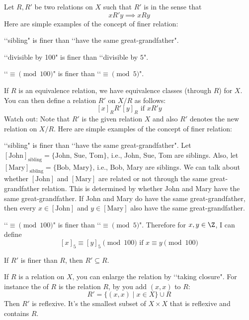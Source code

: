 Let $R, R'$ be two relations on $X$ such that
$R'$ is  in the sense that
\[
x R' y \implies x R y
\]
Here are simple examples of the concept of finer relation:
\begin{myenum}
\item
  \lq\lq sibling" is finer than \lq\lq have the same great-grandfather".
\item
  \lq\lq divisible by 100" is finer than \lq\lq divisible by $5$".
\item
  \lq\lq $\equiv \pmod{100}$" is finer than \lq\lq $\equiv \pmod{5}$".  
\end{myenum}
If $R$ is an equivalence relation, we have equivalence classes (through $R$)
for $X$.
You can then define a relation $R'$ on $X/R$ as follows:
\[
[x]_R R' [y]_R \text{ if } x R' y
\]
Watch out: Note that $R'$ is the given relation $X$
and also $R'$ denotes the new relation on $X/R$.
Here are simple examples of the concept of finer relation:
\begin{myenum}
\item
  \lq\lq sibling" is finer than \lq\lq have the same great-grandfather".
  Let $[\text{John}]_{\text{sibling}} = \{\text{John, Sue, Tom}\}$,
    i.e., John, Sue, Tom are siblings.
  Also, let $[\text{Mary}]_{\text{sibling}} = \{\text{Bob, Mary}\}$,
    i.e., Bob, Mary are siblings.
    We can talk about whether
    $[\text{John}]$ and $[\text{Mary}]$ are related or not
    through the same great-grandfather relation.
    This is determined by whether John and Mary have the same
    great-grandfather.
    If John and Mary do have the same great-grandfather,
    then every $x \in [\text{John}]$ and $y \in [\text{Mary}]$
    also have the same great-grandfather.
\item
  \lq\lq $\equiv \pmod{100}$" is finer than \lq\lq $\equiv \pmod{5}$".
  Therefore for $x, y \in \Z$, I can define
  \[
  [x]_{5} \equiv [y]_5 \pmod{100} \text{ if } x \equiv y \pmod{100}
  \]
\end{myenum}

\begin{prop}
  If $R'$ is finer than $R$, then $R' \subseteq R$.
\end{prop}

If $R$ is a relation on $X$, you can enlarge the relation by \lq\lq taking
closure".
For instance the  of $R$ is the relation $R$, by
you add $(x, x)$ to $R$:
\[
R' = \{(x, x) \mid x \in X\} \cup R
\]
Then $R'$ is reflexive.
It's the smallest subset of $X \times X$ that is reflexive and contains $R$.

